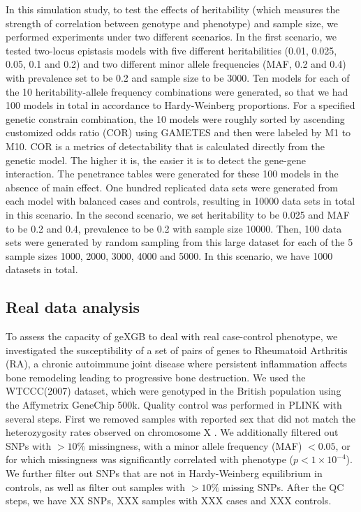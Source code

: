 \documentclass[11pt]{article}
\theoremstyle{plain}
\theoremstyle{definition}
\theoremstyle{remark}
\begin{document}
\noindent In this simulation study, to test the effects of heritability (which measures the strength of correlation between genotype and phenotype) and sample size, we performed experiments under two different scenarios. In the first scenario, we tested two-locus epistasis models with five different heritabilities (0.01, 0.025, 0.05, 0.1 and 0.2) and two different minor allele frequencies (MAF, 0.2 and 0.4) with prevalence set to be 0.2 and sample size to be 3000. Ten models for each of the 10 heritability-allele frequency combinations were generated, so that we had 100 models in total in accordance to Hardy-Weinberg proportions. For a specified genetic constrain combination, the 10 models were roughly sorted by ascending customized odds ratio (COR) using GAMETES and then were labeled by M1 to M10. COR is a metrics of detectability that is calculated directly from the genetic model. The higher it is, the easier it is to detect the gene-gene interaction. The penetrance tables were generated for these 100 models in the absence of main effect. One hundred replicated data sets were generated from each model with balanced cases and controls, resulting in 10000 data sets in total in this scenario. In the second scenario, we set heritability to be 0.025 and MAF to be 0.2 and 0.4, prevalence to be 0.2 with sample size 10000. Then, 100 data sets were generated by random sampling from this large dataset for each of the 5 sample sizes 1000, 2000, 3000, 4000 and 5000. In this scenario, we have 1000 datasets in total.\\

\subsection{Real data analysis}
To assess the capacity of geXGB to deal with real case-control phenotype, we investigated the susceptibility of a set of pairs of genes to Rheumatoid Arthritis (RA), a chronic autoimmune joint disease where persistent inflammation affects bone remodeling leading to progressive bone destruction. We used the WTCCC(2007) dataset, which were genotyped in the British population using the Affymetrix GeneChip 500k. Quality control was performed in PLINK with several steps. First we removed samples with reported sex that did not match the heterozygosity rates observed on chromosome X \cite{12}. We additionally filtered out SNPs with $>10\%$ missingness,  with a minor allele frequency (MAF) $<0.05$, or for which missingness was significantly correlated with
phenotype ($p<1\times 10^{-4}$). We further filter out SNPs that are not in Hardy-Weinberg equilibrium in controls, as well as filter out samples with $>10\%$ missing SNPs. After the QC steps, we have XX SNPs, XXX samples with XXX cases and XXX controls.\\
\end{document}
